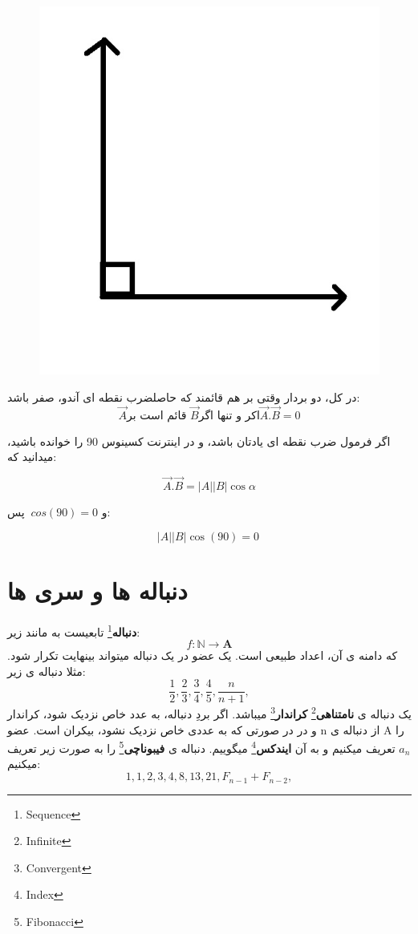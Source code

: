 \documentclass[14pt,a4paper]{memoir}
\begin{document}
	 \begin{figure}[H]
	 	\centering
	 		\includegraphics[scale=0.3]{Orthogonal}
	 \end{figure}

	 در کل، دو بردار وقتی بر هم قائمند که حاصلضرب نقطه ای آندو، صفر باشد:
	 \[ \vec{A} \text{قائم است بر } \vec{B} \text{اکر و تنها اگر} \vec{A}.\vec{B} = 0 \]  
	 
	 اگر فرمول ضرب نقطه ای یادتان باشد، و در اینترنت کسینوس 90 را خوانده باشید، میدانید که:
	 
	 
	 
	 \[ \vec{A}.\vec{B} = |A||B|\cos \alpha \]
	 
	 و $ \ cos(90)  = 0$
	 پس:
	 
	 \[ |A||B|\cos (90) = 0 \ \]
	 
	 
	 
	 \section{دنباله ها و سری ها}\label{seqserie}
	 
	 \textbf{دنباله}\footnote{Sequence} تابعیست به مانند زیر:
	 \[ f: \mathbb{N} \longrightarrow \mathbf{A} \]
	 که دامنه ی آن، اعداد طبیعی است. یک عضو در یک دنباله میتواند بینهایت تکرار شود. مثلا دنباله ی زیر:
	 \[ \frac{1}{2}, \frac{2}{3}, \frac{3}{4}, \frac{4}{5}, \frac{n}{n+1}, \]
	 یک دنباله ی \textbf{نامتناهی}\footnote{Infinite} \textbf{کراندار}\footnote{Convergent} میباشد. اگر بردِ دنباله، به عدد خاص نزدیک شود، کراندار و در در صورتی که به عددی خاص نزدیک نشود، بیکران است.  عضو n از دنباله ی A را $ a_n $ تعریف میکنیم و به آن \textbf{ایندکس}\footnote{Index}  میگوییم.
	 دنباله ی \textbf{فیبوناچی}\footnote{Fibonacci} را به صورت زیر تعریف میکنیم:
	 \[ 1, 1, 2, 3, 4, 8, 13, 21, F_{n-1}+F_{n-2}, \]
	 
\end{document}
